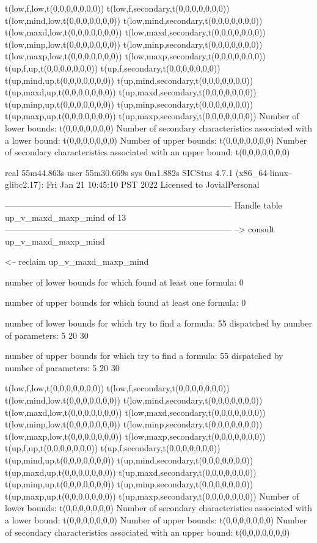 t(low,f,low,t(0,0,0,0,0,0,0))
t(low,f,secondary,t(0,0,0,0,0,0,0))
t(low,mind,low,t(0,0,0,0,0,0,0))
t(low,mind,secondary,t(0,0,0,0,0,0,0))
t(low,maxd,low,t(0,0,0,0,0,0,0))
t(low,maxd,secondary,t(0,0,0,0,0,0,0))
t(low,minp,low,t(0,0,0,0,0,0,0))
t(low,minp,secondary,t(0,0,0,0,0,0,0))
t(low,maxp,low,t(0,0,0,0,0,0,0))
t(low,maxp,secondary,t(0,0,0,0,0,0,0))
t(up,f,up,t(0,0,0,0,0,0,0))
t(up,f,secondary,t(0,0,0,0,0,0,0))
t(up,mind,up,t(0,0,0,0,0,0,0))
t(up,mind,secondary,t(0,0,0,0,0,0,0))
t(up,maxd,up,t(0,0,0,0,0,0,0))
t(up,maxd,secondary,t(0,0,0,0,0,0,0))
t(up,minp,up,t(0,0,0,0,0,0,0))
t(up,minp,secondary,t(0,0,0,0,0,0,0))
t(up,maxp,up,t(0,0,0,0,0,0,0))
t(up,maxp,secondary,t(0,0,0,0,0,0,0))
Number of lower bounds:                                             t(0,0,0,0,0,0,0)
Number of secondary characteristics associated with a lower bound:  t(0,0,0,0,0,0,0)
Number of upper bounds:                                             t(0,0,0,0,0,0,0)
Number of secondary characteristics associated with an upper bound: t(0,0,0,0,0,0,0)

real	55m44.863s
user	55m30.669s
sys	0m1.882s
SICStus 4.7.1 (x86_64-linux-glibc2.17): Fri Jan 21 10:45:10 PST 2022
Licensed to JovialPersonal


--------------------------------------------------------------------------------
Handle table up_v_maxd_maxp_mind of 13
--------------------------------------------------------------------------------
--> consult up_v_maxd_maxp_mind

<-- reclaim up_v_maxd_maxp_mind

number of lower bounds for which found at least one formula: 0

number of upper bounds for which found at least one formula: 0

number of lower bounds for which try to find a formula: 55
dispatched by number of parameters: 5  20  30

number of upper bounds for which try to find a formula: 55
dispatched by number of parameters: 5  20  30

t(low,f,low,t(0,0,0,0,0,0,0))
t(low,f,secondary,t(0,0,0,0,0,0,0))
t(low,mind,low,t(0,0,0,0,0,0,0))
t(low,mind,secondary,t(0,0,0,0,0,0,0))
t(low,maxd,low,t(0,0,0,0,0,0,0))
t(low,maxd,secondary,t(0,0,0,0,0,0,0))
t(low,minp,low,t(0,0,0,0,0,0,0))
t(low,minp,secondary,t(0,0,0,0,0,0,0))
t(low,maxp,low,t(0,0,0,0,0,0,0))
t(low,maxp,secondary,t(0,0,0,0,0,0,0))
t(up,f,up,t(0,0,0,0,0,0,0))
t(up,f,secondary,t(0,0,0,0,0,0,0))
t(up,mind,up,t(0,0,0,0,0,0,0))
t(up,mind,secondary,t(0,0,0,0,0,0,0))
t(up,maxd,up,t(0,0,0,0,0,0,0))
t(up,maxd,secondary,t(0,0,0,0,0,0,0))
t(up,minp,up,t(0,0,0,0,0,0,0))
t(up,minp,secondary,t(0,0,0,0,0,0,0))
t(up,maxp,up,t(0,0,0,0,0,0,0))
t(up,maxp,secondary,t(0,0,0,0,0,0,0))
Number of lower bounds:                                             t(0,0,0,0,0,0,0)
Number of secondary characteristics associated with a lower bound:  t(0,0,0,0,0,0,0)
Number of upper bounds:                                             t(0,0,0,0,0,0,0)
Number of secondary characteristics associated with an upper bound: t(0,0,0,0,0,0,0)

